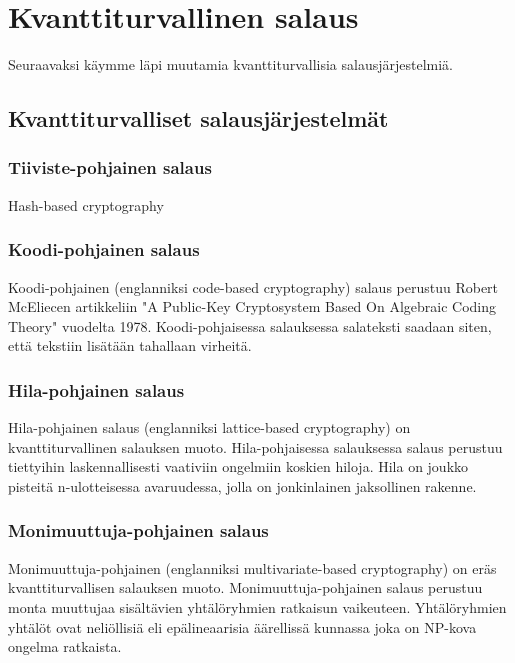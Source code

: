 \chapter{Kvanttiturvallinen salaus\label{results}}
Seuraavaksi käymme läpi muutamia kvanttiturvallisia salausjärjestelmiä.

\section{Kvanttiturvalliset salausjärjestelmät}

\subsection{Tiiviste-pohjainen salaus}
Hash-based cryptography

\subsection{Koodi-pohjainen salaus}
Koodi-pohjainen (englanniksi code-based cryptography) salaus perustuu Robert McEliecen artikkeliin "A Public-Key Cryptosystem Based On Algebraic Coding Theory" vuodelta 1978. Koodi-pohjaisessa salauksessa salateksti saadaan siten, että tekstiin lisätään tahallaan virheitä.

\subsection{Hila-pohjainen salaus}
Hila-pohjainen salaus (englanniksi lattice-based cryptography) on kvanttiturvallinen salauksen muoto. Hila-pohjaisessa salauksessa salaus perustuu tiettyihin laskennallisesti vaativiin ongelmiin koskien hiloja. Hila on joukko pisteitä n-ulotteisessa avaruudessa, jolla on jonkinlainen jaksollinen rakenne.

\subsection{Monimuuttuja-pohjainen salaus}
Monimuuttuja-pohjainen (englanniksi multivariate-based cryptography) on eräs kvanttiturvallisen salauksen muoto. Monimuuttuja-pohjainen salaus perustuu monta muuttujaa sisältävien yhtälöryhmien ratkaisun vaikeuteen. Yhtälöryhmien yhtälöt ovat neliöllisiä eli epälineaarisia äärellissä kunnassa joka on NP-kova ongelma ratkaista. 